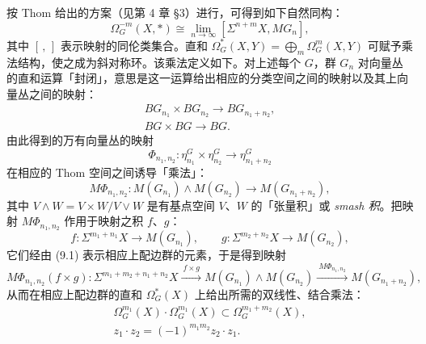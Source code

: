 按 Thom 给出的方案（见第 4 章 §3）进行，可得到如下自然同构：
\begin{equation}
\Omega_G^{-m}(X,*)\cong\lim_{n\to\infty}[\Sigma^{n+m}X,MG_n], \tag{9.1}
\end{equation}
其中 $[\,,\,]$ 表示映射的同伦类集合。直和 $\Omega_G^*(X,Y)=\bigoplus_m\Omega_G^m(X,Y)$ 可赋予乘法结构，使之成为斜对称环。该乘法定义如下。对上述每个 $G$，群 $G_n$ 对向量丛的直和运算「封闭」，意思是这一运算给出相应的分类空间之间的映射以及其上向量丛之间的映射：
\begin{equation}
\begin{gathered}
BG_{n_1}\times BG_{n_2}\to BG_{n_1+n_2},\\
BG\times BG\to BG.
\end{gathered}\tag{9.2}
\end{equation}
由此得到的万有向量丛的映射
\[
\Phi_{n_1,n_2}:\eta_{n_1}^G\times\eta_{n_2}^G\to\eta_{n_1+n_2}^G
\]
在相应的 Thom 空间之间诱导「乘法」：
\[
M\Phi_{n_1,n_2}:M(G_{n_1})\wedge M(G_{n_2})\to M(G_{n_1+n_2}),
\]
其中 $V\wedge W=V\times W/V\vee W$ 是有基点空间 $V$、$W$ 的「张量积」或 \emph{smash 积}。把映射 $M\Phi_{n_1,n_2}$ 作用于映射之积 $f$、$g$：
\[
f:\Sigma^{m_1+n_1}X\to M(G_{n_1}),\qquad g:\Sigma^{m_2+n_2}X\to M(G_{n_2}),
\]
它们经由 (9.1) 表示相应上配边群的元素，于是得到映射
\[
M\Phi_{n_1,n_2}(f\times g):\Sigma^{m_1+m_2+n_1+n_2}X\xrightarrow{\ f\times g\ }M(G_{n_1})\wedge M(G_{n_2})\xrightarrow{\ M\Phi_{n_1,n_2}\ }M(G_{n_1+n_2}),
\]
从而在相应上配边群的直和 $\Omega_G^*(X)$ 上给出所需的双线性、结合乘法：
\begin{equation}
\begin{gathered}
\Omega_G^{m_1}(X)\cdot\Omega_G^{m_1}(X)\subset\Omega_G^{m_1+m_2}(X),\\
z_1\cdot z_2=(-1)^{m_1m_2}z_2\cdot z_1.
\end{gathered}\tag{9.3}
\end{equation}

